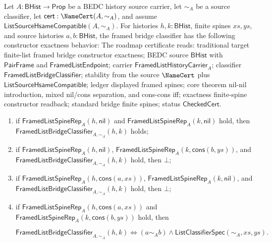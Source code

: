 \begin{theorem}
\label{thm:framed-list-bridge-classifier-constructor-inversion}
Let $A:\mathsf{BHist}\to\mathsf{Prop}$ be a BEDC history source carrier, let
$\sim_A$ be a source classifier, let $\mathsf{cert}:\NameCert(A,\sim_A)$, and
assume $\mathsf{ListSourceHsameCompatible}(A,\sim_A)$. For histories
$h,k:\mathsf{BHist}$, finite spines $xs,ys$, and source histories
$a,b:\mathsf{BHist}$, the framed bridge classifier has the following constructor
exactness behavior:
The roadmap certificate reads: traditional target finite-list framed bridge
constructor exactness; BEDC source $\mathsf{BHist}$ with $\mathsf{PairFrame}$
and $\mathsf{FramedListEndpoint}$; carrier
$\mathsf{FramedListHistoryCarrier}_A$; classifier
$\mathsf{FramedListBridgeClassifier}$; stability from the source $\NameCert$
plus $\mathsf{ListSourceHsameCompatible}$; ledger displayed framed spines; core
theorem nil-nil introduction, mixed nil/cons separation, and cons-cons iff;
exactness finite-spine constructor readback; standard bridge finite spines;
status $\mathsf{CheckedCert}$.
\begin{enumerate}
  \item if $\mathsf{FramedListSpineRep}_A(h,\mathsf{nil})$ and
  $\mathsf{FramedListSpineRep}_A(k,\mathsf{nil})$ hold, then
  $\mathsf{FramedListBridgeClassifier}_{A,\sim_A}(h,k)$ holds;
  \item if $\mathsf{FramedListSpineRep}_A(h,\mathsf{nil})$,
  $\mathsf{FramedListSpineRep}_A(k,\mathsf{cons}(b,ys))$, and
  $\mathsf{FramedListBridgeClassifier}_{A,\sim_A}(h,k)$ hold, then $\bot$;
  \item if $\mathsf{FramedListSpineRep}_A(h,\mathsf{cons}(a,xs))$,
  $\mathsf{FramedListSpineRep}_A(k,\mathsf{nil})$, and
  $\mathsf{FramedListBridgeClassifier}_{A,\sim_A}(h,k)$ hold, then $\bot$;
  \item if $\mathsf{FramedListSpineRep}_A(h,\mathsf{cons}(a,xs))$ and
  $\mathsf{FramedListSpineRep}_A(k,\mathsf{cons}(b,ys))$ hold, then

  $$
  \mathsf{FramedListBridgeClassifier}_{A,\sim_A}(h,k)
  \Longleftrightarrow
  (a\sim_A b)\land \mathsf{ListClassifierSpec}(\sim_A,xs,ys).
  $$

\end{enumerate}
\end{theorem}
